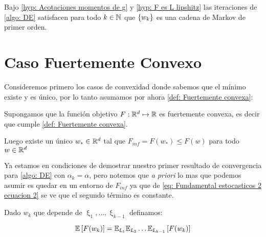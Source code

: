 \begin{corollary}
	\label{coro: DE es una cadena de markov}
	Bajo \ref{hyp: Acotaciones momentos de g} y \ref{hyp: F es L lipshitz} las iteraciones de \ref{algo: DE} satisfacen para todo $k \in {\mathbb{N}}$ que $\left\lbrace w_k\right\rbrace$ es una cadena de Markov de primer orden.
\end{corollary}

\section{Caso Fuertemente Convexo}
Consideremos primero los casos de convexidad donde sabemos que el m\'inimo existe y es \'unico, por lo tanto asumamos por ahora \ref{def: Fuertemente convexa}:

\begin{hyp}
	Supongamos que la funci\'on objetivo $F : {\mathbb{R}}^d \mapsto {\mathbb{R}}$ es fuertemente convexa, es decir que cumple \ref{def: Fuertemente convexa}.
	
	Luego existe un \'unico $w_{*} \in {\mathbb{R}}^d$ tal que $F_{inf} = F(w_*) \leq F(w)$ para todo $w \in {\mathbb{R}}^d$
	
\end{hyp}

Ya estamos en condiciones de demostrar nuestro primer resultado de convergencia para \ref{algo: DE} con $\alpha_k = \alpha$, pero notemos que \textit{a priori} lo mas que podemos asumir es quedar en un entorno de $F_{inf}$ ya que de \ref{eq: Fundamental estocasticos 2 ecuacion 2} se ve que el segundo t\'ermino es constante.

Dado $w_k$ que depende de $\upxi_{1}, \dots, \upxi_{k-1}$ definamos:

\begin{equation*}
	\label{def: esperanza total}
	\mathbb{E} \left[F(w_k)\right] = \mathbb{E}_{\upxi_{1}}\mathbb{E}_{\upxi_{2}}\dots \mathbb{E}_{\upxi_{k-1}}\left[F(w_k)\right]
\end{equation*}

